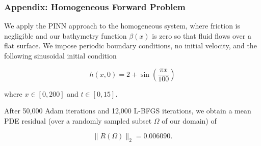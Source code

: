 \begin{frame}
    \frametitle{Appendix: Homogeneous Forward Problem}

    We apply the PINN approach to the homogeneous system, where friction is negligible and our bathymetry function 
    $\beta(x)$ is zero so that fluid flows over a flat surface.  We impose periodic boundary conditions, no initial 
    velocity, and the following sinusoidal initial condition

    $$
    h(x, 0) = 2 + \sin{\left( \frac{\pi x}{100} \right)}
    $$

    where $x \in [0, 200]$ and $t \in [0, 15]$.

    \medskip
    \pause

    After 50,000 Adam iterations and 12,000 L-BFGS iterations, we obtain a mean PDE residual (over a randomly sampled 
    subset $\Omega$ of our domain) of 
    
    $$
    \lVert R(\Omega) \rVert_2 = 0.006090.
    $$
\end{frame}
